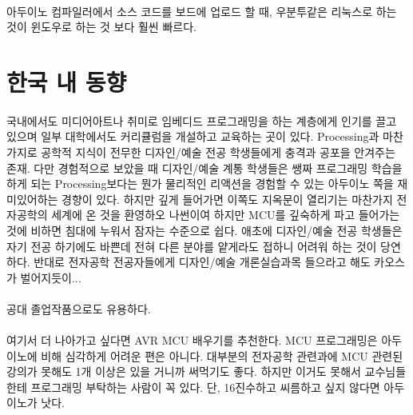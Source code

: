 \documentclass[12pt, a4paper, oneside]{book}
\let\stdsection\section
\renewcommand\section{\newpage\stdsection}
\begin{document}
\paragraph{}
아두이노 컴파일러에서 소스 코드를 보드에 업로드 할 때, 우분투같은 리눅스로 하는 것이 윈도우로 하는 것 보다 훨씬 빠르다.

	\section{ 한국 내 동향 }

\paragraph{}
국내에서도 미디어아트나 취미로 임베디드 프로그래밍을 하는 계층에게 인기를 끌고 있으며 일부 대학에서도 커리큘럼을 개설하고 교육하는 곳이 있다. 
Processing과 마찬가지로 공학적 지식이 전무한 디자인/예술 전공 학생들에게 충격과 공포을 안겨주는 존재. 
다만 경험적으로 보았을 때 디자인/예술 계통 학생들은 쌩짜 프로그래밍 학습을 하게 되는 Processing보다는 뭔가 물리적인 리액션을 경험할 수 있는 아두이노 쪽을 재미있어하는 경향이 있다. 
하지만 깊게 들어가면 이쪽도 지옥문이 열리기는 마찬가지 전자공학의 세계에 온 것을 환영하오 나썬이여 하지만 MCU를 깊숙하게 파고 들어가는 것에 비하면 침대에 누워서 잠자는 수준으로 쉽다. 
애초에 디자인/예술 전공 학생들은 자기 전공 하기에도 바쁜데 전혀 다른 분야를 얕게라도 접하니 어려워 하는 것이 당연하다. 
반대로 전자공학 전공자들에게 디자인/예술 개론실습과목 들으라고 해도 카오스가 벌어지듯이...

\paragraph{}
공대 졸업작품으로도 유용하다.

\paragraph{}
여기서 더 나아가고 싶다면 AVR MCU 배우기를 추천한다. 
MCU 프로그래밍은 아두이노에 비해 심각하게 어려운 편은 아니다. 
대부분의 전자공학 관련과에 MCU 관련된 강의가 못해도 1개 이상은 있을 거니까 써먹기도 좋다.
하지만 이거도 못해서 교수님들 한테 프로그래밍 부탁하는 사람이 꼭 있다. 
단, 16진수하고 씨름하고 싶지 않다면 아두이노가 낫다.



\end{document}
